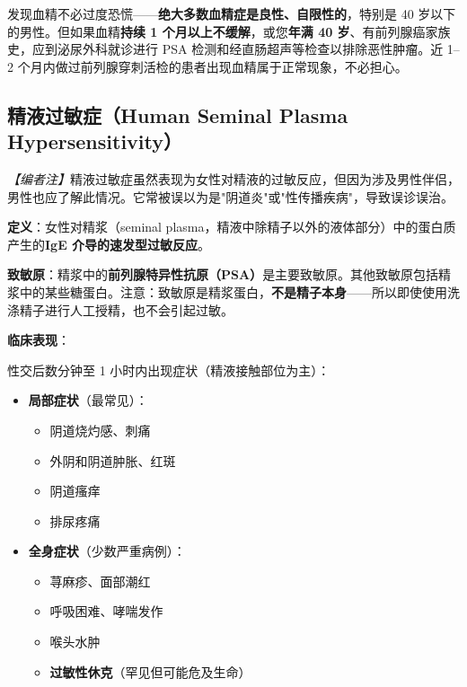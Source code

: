 \begin{tcolorbox}[colback=pink!5!white,colframe=red!50!black,title=贴心小叮咛]
发现血精不必过度恐慌——\textbf{绝大多数血精症是良性、自限性的}，特别是 40 岁以下的男性。但如果血精\textbf{持续 1 个月以上不缓解}，或您\textbf{年满 40 岁}、有前列腺癌家族史，应到泌尿外科就诊进行 PSA 检测和经直肠超声等检查以排除恶性肿瘤。近 1--2 个月内做过前列腺穿刺活检的患者出现血精属于正常现象，不必担心。
\end{tcolorbox}

\subsection{精液过敏症（Human Seminal Plasma Hypersensitivity）}
\label{subsec:seminal_allergy}

\noindent\textit{【编者注】}精液过敏症虽然表现为女性对精液的过敏反应，但因为涉及男性伴侣，男性也应了解此情况。它常被误以为是"阴道炎"或"性传播疾病"，导致误诊误治。

\vspace{0.5em}
\noindent\textbf{定义}：女性对精浆（seminal plasma，精液中除精子以外的液体部分）中的蛋白质产生的\textbf{IgE 介导的速发型过敏反应}。

\vspace{0.5em}
\noindent\textbf{致敏原}：精浆中的\textbf{前列腺特异性抗原（PSA）}是主要致敏原。其他致敏原包括精浆中的某些糖蛋白。注意：致敏原是精浆蛋白，\textbf{不是精子本身}——所以即使使用洗涤精子进行人工授精，也不会引起过敏。

\vspace{0.5em}
\noindent\textbf{临床表现}：

性交后数分钟至 1 小时内出现症状（精液接触部位为主）：
\begin{itemize}[leftmargin=2cm]
	\item \textbf{局部症状}（最常见）：
	\begin{itemize}
		\item 阴道烧灼感、刺痛
		\item 外阴和阴道肿胀、红斑
		\item 阴道瘙痒
		\item 排尿疼痛
	\end{itemize}
	\item \textbf{全身症状}（少数严重病例）：
	\begin{itemize}
		\item 荨麻疹、面部潮红
		\item 呼吸困难、哮喘发作
		\item 喉头水肿
		\item \textbf{过敏性休克}（罕见但可能危及生命）
	\end{itemize}
\end{itemize}


